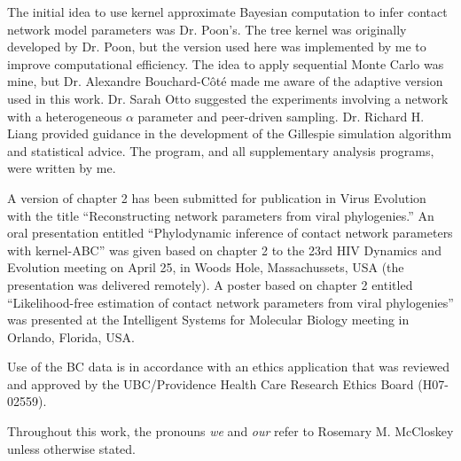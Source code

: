 The initial idea to use kernel approximate Bayesian computation to infer
contact network model parameters was Dr. Poon's. The tree kernel was originally
developed by Dr. Poon, but the version used here was implemented by me to
improve computational efficiency. The idea to apply sequential Monte Carlo was
mine, but Dr. Alexandre Bouchard-C\^ot\'e made me aware of the adaptive version
used in this work. Dr. Sarah Otto suggested the experiments involving a network
with a heterogeneous $\alpha$ parameter and peer-driven sampling. Dr. Richard
H. Liang provided guidance in the development of the Gillespie simulation
algorithm and statistical advice. The  program, and all
supplementary analysis programs, were written by me.

A version of chapter 2 has been submitted for publication in Virus Evolution
with the title ``Reconstructing network parameters from viral phylogenies.'' An
oral presentation entitled ``Phylodynamic inference of contact network
parameters with kernel-ABC'' was given based on chapter 2 to the 23rd HIV
Dynamics and Evolution meeting on April 25, in Woods Hole, Massachussets, USA
(the presentation was delivered remotely). A poster based on chapter 2 entitled
``Likelihood-free estimation of contact network parameters from viral
phylogenies'' was presented at the Intelligent Systems for Molecular Biology
meeting in Orlando, Florida, USA.

Use of the BC data is in accordance with an ethics application that was
reviewed and approved by the UBC/Providence Health Care Research Ethics Board
(H07-02559).

Throughout this work, the pronouns \textit{we} and \textit{our} refer to
Rosemary M. McCloskey unless otherwise stated.
